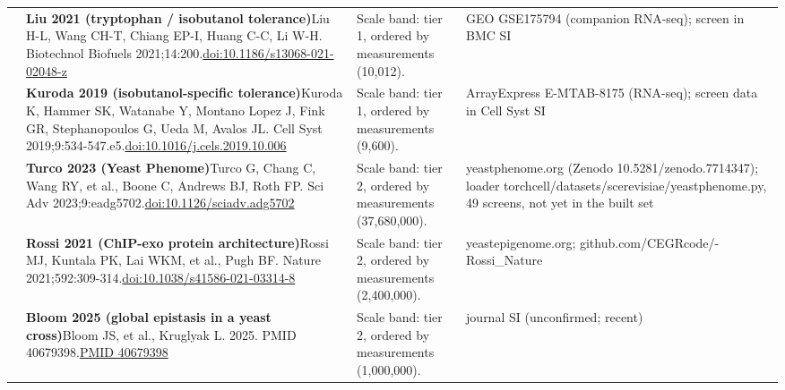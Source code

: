 \begin{landscape}
\begin{longtable}{@{}r@{\hspace{4pt}} L{86mm} L{92mm} L{62mm}@{}}
 & \textbf{Liu 2021 (tryptophan / isobutanol tolerance)}\newline Liu H-L, Wang CH-T, Chiang EP-I, Huang C-C, Li W-H. Biotechnol Biofuels 2021;14:200.\newline \href{https://doi.org/10.1186/s13068-021-02048-z}{doi:10.1186/\allowbreak s13068-021-02048-z} & Scale band: tier 1, ordered by measurements (10,012). & GEO GSE175794 (companion RNA-seq); screen in BMC SI \\
 & \textbf{Kuroda 2019 (isobutanol-specific tolerance)}\newline Kuroda K, Hammer SK, Watanabe Y, Montano Lopez J, Fink GR, Stephanopoulos G, Ueda M, Avalos JL. Cell Syst 2019;9:534-547.e5.\newline \href{https://doi.org/10.1016/j.cels.2019.10.006}{doi:10.1016/\allowbreak j.cels.2019.10.006} & Scale band: tier 1, ordered by measurements (9,600). & ArrayExpress E-MTAB-8175 (RNA-seq); screen data in Cell Syst SI \\
 & \textbf{Turco 2023 (Yeast Phenome)}\newline Turco G, Chang C, Wang RY, et al., Boone C, Andrews BJ, Roth FP. Sci Adv 2023;9:eadg5702.\newline \href{https://doi.org/10.1126/sciadv.adg5702}{doi:10.1126/\allowbreak sciadv.adg5702} & Scale band: tier 2, ordered by measurements (37,680,000). & yeastphenome.org (Zenodo 10.5281/\allowbreak zenodo.7714347); loader torchcell/\allowbreak datasets/\allowbreak scerevisiae/\allowbreak yeastphenome.py, 49 screens, not yet in the built set \\
 & \textbf{Rossi 2021 (ChIP-exo protein architecture)}\newline Rossi MJ, Kuntala PK, Lai WKM, et al., Pugh BF. Nature 2021;592:309-314.\newline \href{https://doi.org/10.1038/s41586-021-03314-8}{doi:10.1038/\allowbreak s41586-021-03314-8} & Scale band: tier 2, ordered by measurements (2,400,000). & yeastepigenome.org; github.com/\allowbreak CEGRcode/-Rossi\_Nature \\
 & \textbf{Bloom 2025 (global epistasis in a yeast cross)}\newline Bloom JS, et al., Kruglyak L. 2025. PMID 40679398.\newline \href{https://pubmed.ncbi.nlm.nih.gov/40679398/}{PMID 40679398} & Scale band: tier 2, ordered by measurements (1,000,000). & journal SI (unconfirmed; recent) \\

\end{longtable}
\end{landscape}
